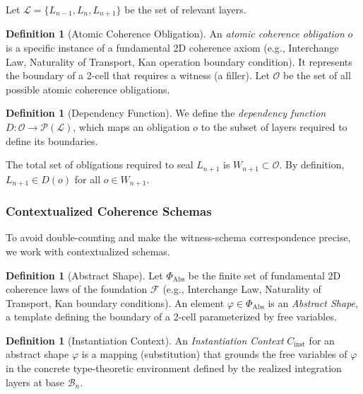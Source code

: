 \documentclass[11pt]{article}
\theoremstyle{definition}
\newtheorem{definition}[theorem]{Definition}
\theoremstyle{remark}
\begin{document}
Let $\mathcal{L} = \{L_{n-1}, L_n, L_{n+1}\}$ be the set of relevant layers.

\begin{definition}[Atomic Coherence Obligation]
\label{def:atomic-obligation}
An \emph{atomic coherence obligation} $o$ is a specific instance of a fundamental 2D coherence axiom
(e.g., Interchange Law, Naturality of Transport, Kan operation boundary condition). It represents
the boundary of a 2-cell that requires a witness (a filler). Let $\mathcal{O}$ be the set of all possible
atomic coherence obligations.
\end{definition}

\begin{definition}[Dependency Function]
\label{def:dependency}
We define the \emph{dependency function} $D: \mathcal{O} \to \mathcal{P}(\mathcal{L})$, which maps an obligation $o$ to
the subset of layers required to define its boundaries.

The total set of obligations required to seal $L_{n+1}$ is $W_{n+1} \subset \mathcal{O}$. By definition,
$L_{n+1} \in D(o)$ for all $o \in W_{n+1}$.
\end{definition}

\subsubsection{Contextualized Coherence Schemas}

To avoid double-counting and make the witness-schema correspondence precise, we work with
contextualized schemas.

\begin{definition}[Abstract Shape]
\label{def:abstract-shape}
Let $\Phi_{\text{Abs}}$ be the finite set of fundamental 2D coherence laws of the foundation $\mathcal{F}$ (e.g.,
Interchange Law, Naturality of Transport, Kan boundary conditions). An element $\varphi \in \Phi_{\text{Abs}}$
is an \emph{Abstract Shape}, a template defining the boundary of a 2-cell parameterized by free
variables.
\end{definition}

\begin{definition}[Instantiation Context]
\label{def:instantiation-context}
An \emph{Instantiation Context} $C_{\text{inst}}$ for an abstract shape $\varphi$ is a mapping (substitution)
that grounds the free variables of $\varphi$ in the concrete type-theoretic environment defined by the
realized integration layers at base $\mathcal{B}_n$.
\end{definition}
\end{document}

